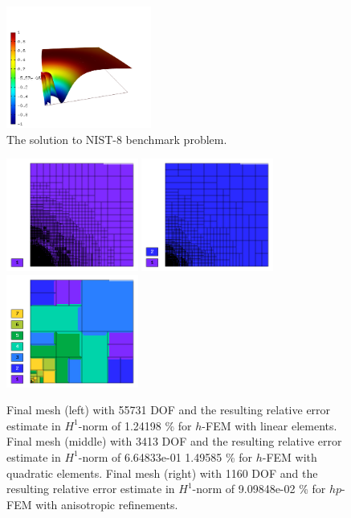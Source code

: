 \documentclass[12pt]{elsarticle}
\begin{document}
\begin{figure}[!ht]
\centering
\includegraphics[height=4cm]{nist/nist-8/solution.png}
\caption{The solution to NIST-8 benchmark problem.}
\label{fig:sln-nist08}
\end{figure}

\begin{figure}[!ht]
\centering
\includegraphics[height=3.7cm]{nist/nist-8/mesh_h1_aniso.png}
\includegraphics[height=3.7cm]{nist/nist-8/mesh_h2_aniso.png}
\includegraphics[height=3.7cm]{nist/nist-8/mesh_hp_aniso.png}
\caption{
Final mesh (left) with 55731 DOF and the resulting
relative error estimate in $H^1$-norm of 1.24198 \% for $h$-FEM with linear elements.
Final mesh (middle) with 3413 DOF and the resulting
relative error estimate in $H^1$-norm of 6.64833e-01 1.49585 \% for $h$-FEM with quadratic elements.
Final mesh (right) with 1160 DOF and the resulting
relative error estimate in $H^1$-norm of 9.09848e-02 \% for $hp$-FEM with anisotropic refinements.}
\label{fig:nist-8-hp-aniso}
\end{figure}
\end{document}
